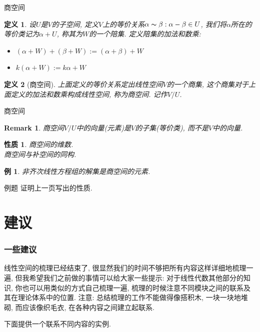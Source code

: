 \documentclass[11pt]{beamer}
\newtheorem{defi}{定义}[section]
\newtheorem{prop}{性质}[section]
\newtheorem{exmp}{例}[section]
\newtheorem{rmk}{Remark}[section]
\begin{document}
\begin{frame}{商空间}
	\begin{defi}
		设$U$是$V$的子空间, 定义$V$上的等价关系$\alpha\thicksim\beta: \alpha-\beta\in U$, 我们将$\alpha$所在的等价类记为$\alpha+U$, 称其为$W$的一个陪集. 定义陪集的加法和数乘:
		\begin{itemize}
			\item $(\alpha+W)+(\beta+W):=(\alpha+\beta)+W$
			\item $k(\alpha+W):=k\alpha+W$
		\end{itemize}
	\end{defi}
	\begin{defi}[商空间]
		上面定义的等价关系定出线性空间$V$的一个商集, 这个商集对于上面定义的加法和数乘构成线性空间, 称为商空间. 记作$V/U$.
	\end{defi}
\end{frame}

\begin{frame}{商空间}
\begin{rmk}
	商空间$V/U$中的向量(元素)是$V$的子集(等价类), 而不是$V$中的向量.
\end{rmk}
\begin{prop}
	商空间的维数.\\
	商空间与补空间的同构.
\end{prop}
\begin{exmp}
	非齐次线性方程组的解集是商空间的元素.
\end{exmp}
\end{frame}

\begin{frame}{例题}
	证明上一页写出的性质.
\end{frame}

\section{建议}

\frame{\sectionpage}

\begin{frame}
	\frametitle{一些建议}
	线性空间的梳理已经结束了, 很显然我们的时间不够把所有内容这样详细地梳理一遍,
	但我希望我们之前做的事情可以给大家一些提示: 对于线性代数其他部分的知识,
	你也可以用类似的方式自己梳理一遍, 梳理的时候注意不同模块之间的联系及其在理论体系中的位置.
	注意: 总结梳理的工作不能做得像搭积木, 一块一块地堆砌, 而应该像织毛衣,
	在各种内容之间建立起联系.\par
	下面提供一个联系不同内容的实例.
\end{frame}
\end{document}

